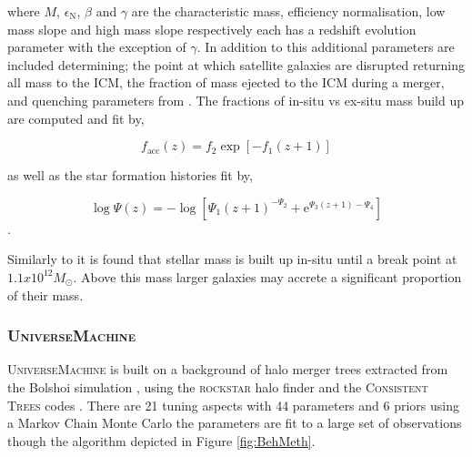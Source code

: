 where $M$, $\epsilon_{\mathrm{N}}$, $\beta$ and $\gamma$ are the characteristic mass, efficiency normalisation, low mass slope and high mass slope respectively each has a redshift evolution parameter with the exception of $\gamma$. In addition to this additional parameters are included determining; the point at which satellite galaxies are disrupted returning all mass to the ICM, the fraction of mass ejected to the ICM during a merger, and quenching parameters from \citet{Wetzel2013GalaxyUniverse}. The fractions of in-situ vs ex-situ mass build up are computed and fit by,

\begin{equation}
f_{\mathrm{acc}}(z) =f_{2} \exp \left[-f_{1}(z+1)\right] 
\end{equation}

as well as the star formation histories fit by,

\begin{equation}
\log \Psi(z) =-\log \left[\Psi_{1}(z+1)^{-\Psi_{2}}+\mathrm{e}^{\Psi_{3}(z+1)-\Psi_{4}}\right] 
\end{equation}.

Similarly to \citet{Rodriguez-Puebla2017ConstrainingProperties} it is found that stellar mass is built up in-situ until a break point at $1.1 x 10^{12} M_{\odot}$. Above this mass larger galaxies may accrete a significant proportion of their mass.

\subsubsection{U\textsc{niverse}M\textsc{achine}}
U\textsc{niverse}M\textsc{achine} \cite{Behroozi2019UniverseMachine:010} is built on a background of halo merger trees extracted from the Bolshoi simulation \citep{Klypin2016,Rodriguez-Puebla2016HaloSimulations}, using the \textsc{rockstar} halo finder and the C\textsc{onsistent} T\textsc{rees} codes \cite{Behroozi2011TheCores, Behroozi2013GRAVITATIONALLYCOSMOLOGY}. There are 21 tuning aspects with 44 parameters and 6 priors using a Markov Chain Monte Carlo the parameters are fit to a large set of observations though the algorithm depicted in Figure \ref{fig:BehMeth}.

